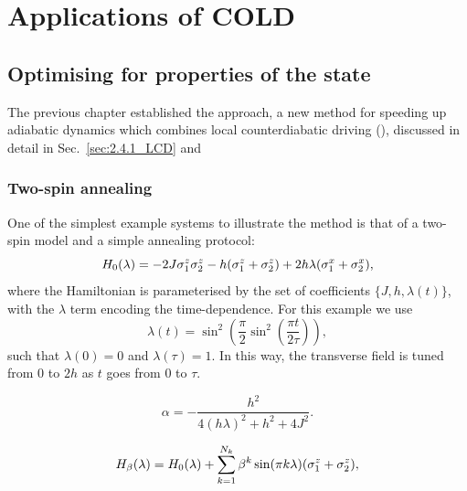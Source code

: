 \part{Applications of COLD}

\chapter{Optimising for properties of the state}\label{chap:6_Applications_fidelity}

The previous chapter established the  approach, a new method for speeding up adiabatic dynamics which combines local counterdiabatic driving (), discussed in detail in Sec.~\ref{sec:2.4.1_LCD} and  

\section{Two-spin annealing}\label{sec:5.1_2spin_annealing}

One of the simplest example systems to illustrate the  method is that of a two-spin model and a simple annealing protocol:
\begin{equation}\label{eq:two_spin_hamiltonian}
H_0(\lambda) = -2J \sigma^z_1 \sigma^z_2 - h ( \sigma^z_{1} + \sigma^z_{2}) +  2h \lambda (\sigma^x_{1} + \sigma^x_{2}),
\end{equation}
where the Hamiltonian is parameterised by the set of coefficients $\{J, h, \lambda(t)\}$, with the $\lambda$ term encoding the time-dependence. For this example we use
\begin{equation}\label{eq:lambda_func1}
\lambda(t) = \sin^2\left(\frac{\pi}{2} \sin^2 \left( \frac{\pi t}{2 \tau} \right) \right),
\end{equation}
such that $\lambda(0) = 0$ and $\lambda(\tau) = 1$. In this way, the transverse field is tuned from $0$ to $2h$ as $t$ goes from $0$ to $\tau$.

\begin{equation}\label{eq:two_spin_alpha}
\alpha = - \frac{h^2}{4(h\lambda)^2 + h^2 + 4J^2}.
\end{equation}

\begin{equation}\label{eq:H_optimal_control}
H_\beta(\lambda) = H_0(\lambda) + \sum_{k=1}^{N_k} \beta^k \sin (\pi k \lambda) ( \sigma^z_{1} + \sigma^z_{2}),
\end{equation}

